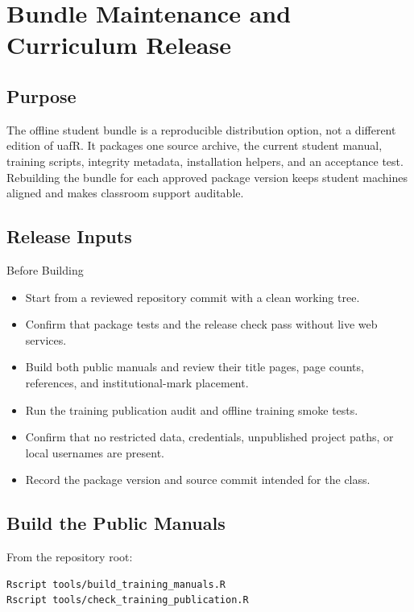 \chapter{Bundle Maintenance and Curriculum Release}

\section{Purpose}
The offline student bundle is a reproducible distribution option, not a
different edition of uafR. It packages one source archive, the current student
manual, training scripts, integrity metadata, installation helpers, and an
acceptance test. Rebuilding the bundle for each approved package version keeps
student machines aligned and makes classroom support auditable.

\section{Release Inputs}
\begin{checklistbox}{Before Building}
\begin{itemize}
  \item Start from a reviewed repository commit with a clean working tree.
  \item Confirm that package tests and the release check pass without live web
        services.
  \item Build both public manuals and review their title pages, page counts,
        references, and institutional-mark placement.
  \item Run the training publication audit and offline training smoke tests.
  \item Confirm that no restricted data, credentials, unpublished project
        paths, or local usernames are present.
  \item Record the package version and source commit intended for the class.
\end{itemize}
\end{checklistbox}

\section{Build the Public Manuals}
From the repository root:

\begin{verbatim}
Rscript tools/build_training_manuals.R
Rscript tools/check_training_publication.R
\end{verbatim}

